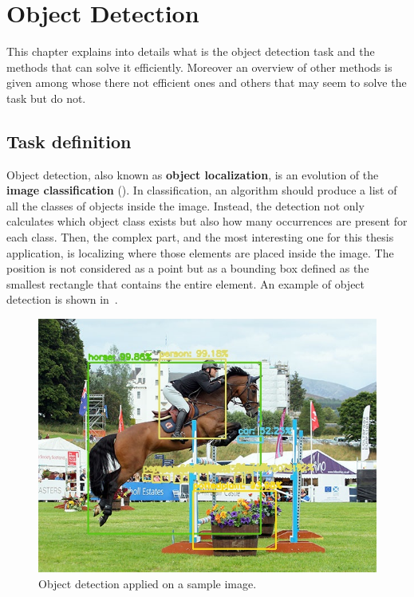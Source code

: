 \chapter{Object Detection} \label{cha:detection}
This chapter explains into details what is the object detection task and the methods that can solve it efficiently. Moreover an overview of other methods is given among whose there not efficient ones and others that may seem to solve the task but do not.

\section{Task definition}
Object detection, also known as \textbf{object localization}, is an evolution of the \textbf{image classification} (). In classification, an algorithm should produce a list of all the classes of objects inside the image. Instead, the detection not only calculates which object class exists but also how many occurrences are present for each class. Then, the complex part, and the most interesting one for this thesis application, is localizing where those elements are placed inside the image. The position is not considered as a point but as a bounding box defined as the smallest rectangle that contains the entire element. An example of object detection is shown in~.
\begin{figure}[!h]
	\centering
	\includegraphics[width=0.8\linewidth]{images/detection/ex1_yolo}
	\caption{Object detection applied on a sample image.}
	\label{fig:sampleYolo}
\end{figure}

